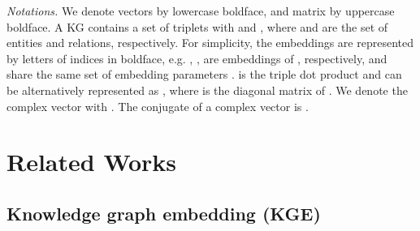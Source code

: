 \documentclass[conference]{IEEEtran}
\begin{document}
{
\noindent
\textit{Notations.}
We denote vectors by lowercase boldface, and matrix by uppercase boldface.
A KG contains a set of triplets  with  and ,
where  and  are the set of entities and relations, respectively.
For simplicity, the embeddings are represented by letters of indices in boldface, 
e.g. , ,  are embeddings of , respectively,
and  share the same set of embedding parameters .
 is the triple dot product 
and can be alternatively represented as ,
where  is the diagonal matrix of .
We denote the complex vector  with .
The conjugate of a complex vector is .
}




\section{Related Works}
\label{sec:relworks}


\subsection{Knowledge graph embedding (KGE)}
\label{ssec:score}
\end{document}
